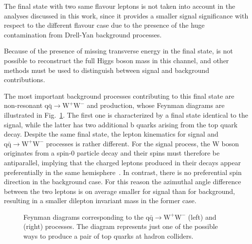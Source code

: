 The final state with two same flavour leptons is not taken into account in the analyses discussed in this work, since it provides a smaller signal significance with respect to the different flavour case due to the presence of the huge contamination from Drell-Yan background processes.

Because of the presence of missing transverse energy in the final state, is not possible to reconstruct the full Higgs boson mass in this channel, and other methods must be used to distinguish between signal and background contributions.

The most important background processes contributing to this final state are non-resonant $\mathrm{q\bar q \to W^+W^-}$ and \ttbar production, whose Feynman diagrams are illustrated in Fig.~\ref{fig:wwandtop}. The first one is characterized by a final state identical to the signal, while the latter has two additional b quarks arising from the top quark decay. Despite the same final state, the lepton kinematics for signal and $\mathrm{q\bar q \to W^+W^-}$ processes is rather different. For the signal process, the W boson originates from a spin-0 particle decay and their spins must therefore be antiparallel, implying that the charged leptons produced in their decays appear preferentially in the same hemisphere~\cite{Ellis:2012wg}. In contrast, there is no preferential spin direction in the background case.
For this reason the azimuthal angle difference between the two leptons is on average smaller for signal than for background, resulting in a smaller dilepton invariant mass in the former case.

\begin{figure}[htb]
\centering
{}
\caption{Feynman diagrams corresponding to the $\mathrm{q\bar q \to W^+W^-}$ (left) and \ttbar (right) processes. The \ttbar diagram represents just one of the possible ways to produce a pair of top quarks at hadron colliders.}\label{fig:wwandtop}
\end{figure}

